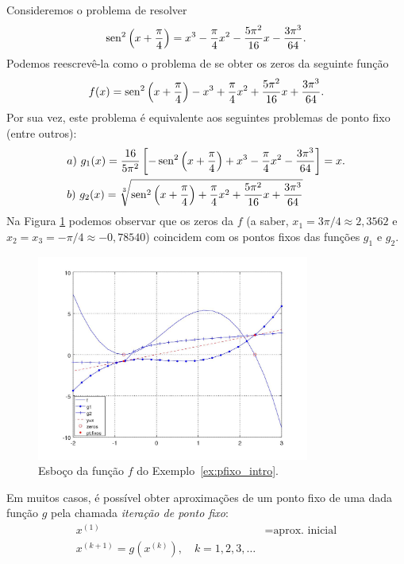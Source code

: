 \begin{ex}\label{ex:pfixo_intro}
  Consideremos o problema de resolver
  \begin{equation}
    \operatorname{sen}^2\left(x+\frac{\pi}{4}\right) = x^3 - \frac{\pi}{4}x^2 - \frac{5\pi^2}{16}x - \frac{3\pi^3}{64}.
  \end{equation}
Podemos reescrevê-la como o problema de se obter os zeros da seguinte função
\begin{equation}
  f(x) = \operatorname{sen}^2\left(x+\frac{\pi}{4}\right) - x^3 + \frac{\pi}{4}x^2 + \frac{5\pi^2}{16}x + \frac{3\pi^3}{64}.
\end{equation}
Por sua vez, este problema é equivalente aos seguintes problemas de ponto fixo (entre outros):
\begin{align}
  &a)~g_1(x) = \frac{16}{5\pi^2}\left[-\operatorname{sen}^2\left(x+\frac{\pi}{4}\right) + x^3 - \frac{\pi}{4}x^2 - \frac{3\pi^3}{64}\right] = x.\\
  &b)~g_2(x) = \sqrt[3]{\operatorname{sen}^2\left(x+\frac{\pi}{4}\right) + \frac{\pi}{4}x^2 + \frac{5\pi^2}{16}x + \frac{3\pi^3}{64}}
\end{align}
Na Figura \ref{fig:pfixo_intro} podemos observar que os zeros da $f$ (a saber, $x_1=3\pi/4\approx 2,3562$ e $x_2=x_3=-\pi/4\approx -0,78540$) coincidem com os pontos fixos das funções $g_1$ e $g_2$.

\begin{figure}[h!]
  \centering
  \includegraphics[width=0.8\textwidth]{./cap_eq1d/dados/ex_pfixo_intro/fig_pfixo_intro}
  \caption{Esboço da função $f$ do Exemplo~\ref{ex:pfixo_intro}.}
  \label{fig:pfixo_intro}
\end{figure}
\end{ex}

Em muitos casos, é possível obter aproximações de um ponto fixo de uma dada função $g$ pela chamada \emph{iteração de ponto fixo}:
\begin{align}
  x^{(1)} &= \text{aprox. inicial}\\
  x^{(k+1)} = g(x^{(k)}),\quad k=1, 2, 3, \ldots
\end{align}

